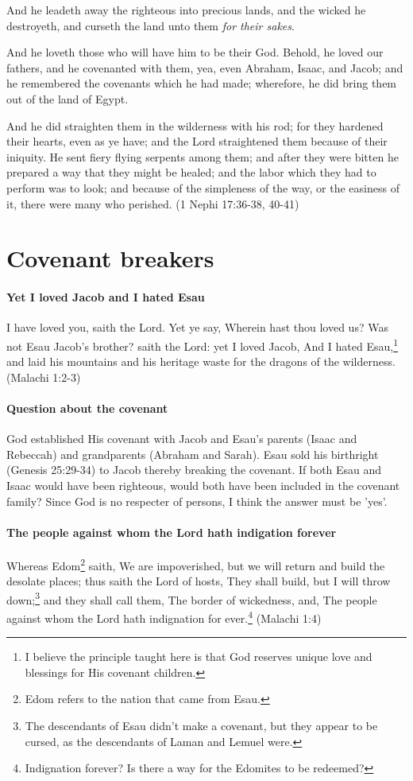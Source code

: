 And he leadeth away the righteous into precious lands, and the wicked he destroyeth, and curseth the land unto them \textit{for their sakes}.

And he loveth those who will have him to be their God. Behold, he loved our fathers, and he covenanted with them, yea, even Abraham, Isaac, and Jacob; and he remembered the covenants which he had made; wherefore, he did bring them out of the land of Egypt.

And he did straighten them in the wilderness with his rod; for they hardened their hearts, even as ye have; and the Lord straightened them because of their iniquity. He sent fiery flying serpents among them; and after they were bitten he prepared a way that they might be healed; and the labor which they had to perform was to look; and because of the simpleness of the way, or the easiness of it, there were many who perished. (1 Nephi 17:36-38, 40-41)


\section{Covenant breakers}

\paragraph{Yet I loved Jacob and I hated Esau}
I have loved you, saith the Lord. Yet ye say, Wherein hast thou loved us? Was not Esau Jacob's brother? saith the Lord: yet I loved Jacob, And I hated Esau,\footnote{I believe the principle taught here is that God reserves unique love and blessings for His covenant children.} and laid his mountains and his heritage waste for the dragons of the wilderness. (Malachi 1:2-3)

\paragraph{Question about the covenant}
God established His covenant with Jacob and Esau's parents (Isaac and Rebeccah) and grandparents (Abraham and Sarah). Esau sold his birthright (Genesis 25:29-34) to Jacob thereby breaking the covenant. If both Esau and Isaac would have been righteous, would both have been included in the covenant family? Since God is no respecter of persons, I think the answer must be 'yes'.

\paragraph{The people against whom the Lord hath indigation forever}
Whereas Edom\footnote{Edom refers to the nation that came from Esau.} saith, We are impoverished, but we will return and build the desolate places; thus saith the Lord of hosts, They shall build, but I will throw down;\footnote{The descendants of Esau didn't make a covenant, but they appear to be cursed, as the descendants of Laman and Lemuel were.} and they shall call them, The border of wickedness, and, The people against whom the Lord hath indignation for ever.\footnote{Indignation forever? Is there a way for the Edomites to be redeemed?} (Malachi 1:4)

